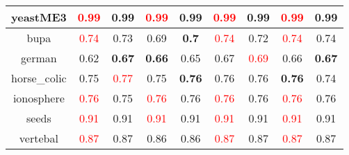 \documentclass{article}%
\begin{document}
\begin{tabular}{c|cccccccc}
\hline%
yeastME3&\textcolor{red}{ 
0.99
}&0.99&\textcolor{red}{ 
0.99
}&0.99&\textcolor{red}{ 
0.99
}&0.99&\textcolor{red}{ 
0.99
}&0.99\\%
\hline%
bupa&\textcolor{red}{ 
0.74
}&0.73&0.69&\textbf{0.7}&\textcolor{red}{ 
0.74
}&0.72&\textcolor{red}{ 
0.74
}&0.74\\%
\hline%
german&0.62&\textbf{0.67}&\textbf{0.66}&0.65&0.67&\textcolor{red}{ 
0.69
}&0.66&\textbf{0.67}\\%
\hline%
horse\_colic&0.75&\textcolor{red}{ 
0.77
}&0.75&\textbf{0.76}&0.76&0.76&\textbf{0.76}&0.74\\%
\hline%
ionosphere&\textcolor{red}{ 
0.76
}&0.75&\textcolor{red}{ 
0.76
}&0.76&\textcolor{red}{ 
0.76
}&0.76&\textcolor{red}{ 
0.76
}&0.76\\%
\hline%
seeds&\textcolor{red}{ 
0.91
}&0.91&\textcolor{red}{ 
0.91
}&0.91&\textcolor{red}{ 
0.91
}&0.91&\textcolor{red}{ 
0.91
}&0.91\\%
\hline%
vertebal&\textcolor{red}{ 
0.87
}&0.87&0.86&0.86&\textcolor{red}{ 
0.87
}&0.87&\textcolor{red}{ 
0.87
}&0.87\\%
\hline%
\end{tabular}

%
\end{document}
